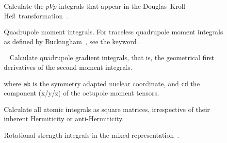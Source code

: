 \begin{description}
\item[] Calculate the $pVp$ integrals that appear in the
Douglas--Kroll--He\ss\ transformation~\cite{bahpra33}.


\item[] Quadrupole moment integrals. For traceless quadrupole moment integrals as
defined by Buckingham~\cite{adbacp12}, see the keyword .


\item[]\verb| |\newline
Calculate quadrupole gradient integrals, that is, the geometrical first
derivatives of the second moment integrals.

where \verb|ab| is the symmetry adapted nuclear coordinate, and \verb|cd| the
component (x/y/z) of the octupole moment tensors.

\item[] Calculate all atomic integrals as square
matrices, irrespective of their inherent Hermiticity or
anti-Hermiticity.

\item[] Rotational strength integrals in the mixed
representation~\cite{tbphkkrjcp110}.



\end{description}
